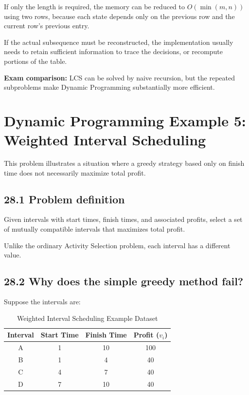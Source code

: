If only the length is required, the memory can be reduced to $O(\min(m,n))$ using two rows, because each state depends only on the previous row and the current row's previous entry.

If the actual subsequence must be reconstructed, the implementation usually needs to retain sufficient information to trace the decisions, or recompute portions of the table.

\textbf{Exam comparison:} LCS can be solved by naive recursion, but the repeated subproblems make Dynamic Programming substantially more efficient.

\section{Dynamic Programming Example 5: Weighted Interval Scheduling}

This problem illustrates a situation where a greedy strategy based only on finish time does not necessarily maximize total profit.

\subsection{28.1 Problem definition}

Given intervals with start times, finish times, and associated profits, select a set of mutually compatible intervals that maximizes total profit.

Unlike the ordinary Activity Selection problem, each interval has a different value.

\subsection{28.2 Why does the simple greedy method fail?}

Suppose the intervals are:

\begin{table}[htbp]
\centering
\caption{Weighted Interval Scheduling Example Dataset}
\label{tab:weighted_intervals}
\begin{tabular}{cccc}
\toprule
\textbf{Interval} & \textbf{Start Time} & \textbf{Finish Time} & \textbf{Profit ($v_i$)} \\
\midrule
A & 1 & 10 & 100 \\
B & 1 & 4 & 40 \\
C & 4 & 7 & 40 \\
D & 7 & 10 & 40 \\
\bottomrule
\end{tabular}
\end{table}

